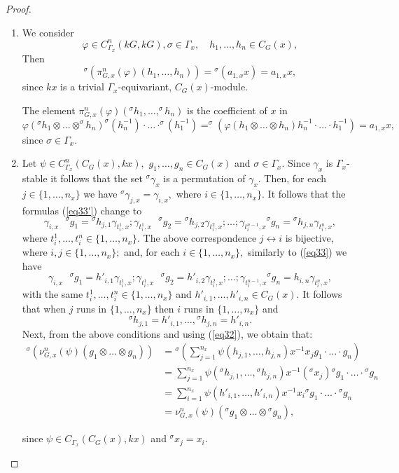 \documentclass[10pt,a4paper]{amsart}
\begin{document}
\begin{proof}

\begin{enumerate}
\item[i).] We consider $$\varphi\in C_{\Gamma_x}^n(kG,kG),\sigma\in \Gamma_x,\quad h_1,\ldots,h_n\in C_G(x),$$
Then $${}^{\sigma}(\pi_{G,x}^n(\varphi)(h_1,\ldots,h_n))={}^{\sigma}(a_{1,x}x)=a_{1,x}x,$$
since  $kx$ is a trivial $\Gamma_x$-equivariant, $C_G(x)$-module.

The element $\pi_{G,x}^n(\varphi)(^{\sigma}h_1,\dots,^{\sigma}h_n)$ is the coefficient of $x$ in $$\varphi(^{\sigma}h_1\otimes\dots \otimes^{\sigma}h_n)^{\sigma}(h_n^{-1})\cdot \dots \cdot ^{\sigma}(h_1^{-1})=^{\sigma}(\varphi(h_1\otimes\dots \otimes h_n)h_n^{-1}\cdot \dots \cdot h_1^{-1})=a_{1,x}x,$$ since $\sigma\in \Gamma_x.$

\item[ii).] Let $\psi \in C_{\Gamma_x}^n(C_G(x),kx),$ $g_1,\dots,g_n\in C_G(x)$ and $\sigma \in \Gamma_x.$ Since $\gamma_x$ is $\Gamma_x$-stable it follows that the set ${}^\sigma\gamma_x$ is a permutation of $\gamma_x.$ Then, for each $j\in\{1,\ldots, n_x\}$ we have ${}^{\sigma}\gamma_{j,x}=\gamma_{i,x},$ where $i\in\{1,\ldots,n_x\}.$ It follows that the formulas (\ref{eq33'}) change to
$$\gamma_{i,x}\mbox{ }^{\sigma}g_1={}^{\sigma}h_{j,1}\gamma_{t_i^1,x}; \gamma_{t_i^1,x}\mbox{ }^{\sigma}g_2=
    {}^{\sigma}h_{j,2}\gamma_{t_i^2,x};
    \dots;\gamma_{t_i^{n-1},x}{ }^{\sigma}g_n={}^{\sigma}h_{j,n}\gamma_{t_i^n,x},$$
 where $t_i^1,\ldots,t_i^n\in\{1,\ldots,n_x\}.$
 The above correspondence $j\leftrightarrow i$ is bijective, where $i,j\in\{1,\ldots,n_x\};$  and, for each $i\in\{1,\ldots,n_x\},$ similarly to (\ref{eq33})  we have
 $$\gamma_{i,x}\mbox{ }^{\sigma}g_1=h'_{i,1}\gamma_{t_i^1,x}; \gamma_{t_i^1,x}\mbox{ }^{\sigma}g_2=
    h'_{i,2}\gamma_{t_i^2,x};
    \dots;\gamma_{t_i^{n-1},x}{ }^{\sigma}g_n=h_{i,n}\gamma_{t_i^n,x},$$
with the same $t_i^1,\ldots,t_i^n\in\{1,\ldots,n_x\}$ and $h'_{i,1},\ldots, h'_{i,n}\in C_G(x).$ It follows that when $j$ runs in $\{1,\ldots,n_x\}$ then $i$ runs in $\{1,\ldots,n_x\}$ and
$${}^{\sigma}h_{j,1}=h'_{i,1}, \ldots, {}^{\sigma}h_{j,n}=h'_{i,n}.$$
Next, from the above conditions and using (\ref{eq32}), we obtain that:
\begin{align*}
{}^{\sigma}(\nu_{G,x}^n(\psi)(g_1\otimes \dots \otimes g_n))&={}^{\sigma}\left(\sum_{j=1}^{n_x}\psi(h_{j,1},\dots,h_{j,n})x^{-1} x_j g_1 \cdot \dots \cdot g_n\right)\\
&=\sum_{j=1}^{n_x}\psi({}^{\sigma}h_{j,1},\dots,{}^{\sigma}h_{j,n})x^{-1}({}^{\sigma} x_j)  { }^{\sigma} g_1 \cdot \dots \cdot {}^{\sigma}g_n\\
     &=\sum_{i=1}^{n_x}\psi(h'_{i,1},\dots,h'_{i,n})x^{-1} x_i { }^{\sigma} g_1 \cdot \dots \cdot {}^{\sigma}g_n\\
     &=\nu_{G,x}^n(\psi)({}^{\sigma}g_1\otimes \dots \otimes {}^{\sigma} g_n),
 \end{align*}

since $\psi \in C_{\Gamma_x}(C_G(x),kx)$ and ${}^{\sigma}x_j=x_i.$
\end{enumerate}

\end{proof}
\end{document}

